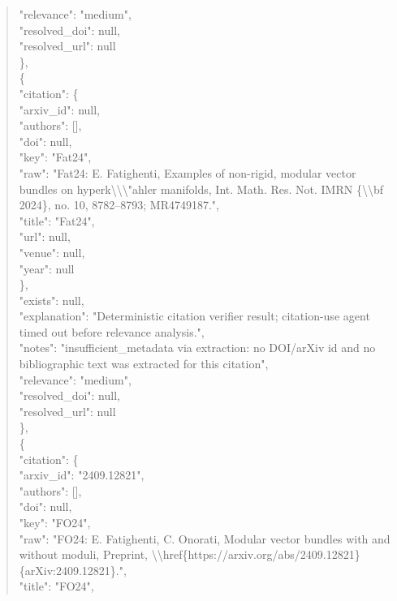 \documentclass[11pt]{article}
\begin{document}
\begin{quote}
      "relevance": "medium",\\
      "resolved\_doi": null,\\
      "resolved\_url": null\\
    \},\\
    \{\\
      "citation": \{\\
        "arxiv\_id": null,\\
        "authors": [],\\
        "doi": null,\\
        "key": "Fat24",\\
        "raw": "Fat24: E. Fatighenti, Examples of non-rigid, modular vector bundles on hyperk\textbackslash{}\textbackslash{}\textbackslash{}"ahler manifolds, Int. Math. Res. Not. IMRN \{\textbackslash{}\textbackslash{}bf 2024\}, no. 10, 8782--8793; MR4749187.",\\
        "title": "Fat24",\\
        "url": null,\\
        "venue": null,\\
        "year": null\\
      \},\\
      "exists": null,\\
      "explanation": "Deterministic citation verifier result; citation-use agent timed out before relevance analysis.",\\
      "notes": "insufficient\_metadata via extraction: no DOI/arXiv id and no bibliographic text was extracted for this citation",\\
      "relevance": "medium",\\
      "resolved\_doi": null,\\
      "resolved\_url": null\\
    \},\\
    \{\\
      "citation": \{\\
        "arxiv\_id": "2409.12821",\\
        "authors": [],\\
        "doi": null,\\
        "key": "FO24",\\
        "raw": "FO24: E. Fatighenti, C. Onorati, Modular vector bundles with and without moduli, Preprint, \textbackslash{}\textbackslash{}href\{https://arxiv.org/abs/2409.12821\}\{arXiv:2409.12821\}.",\\
        "title": "FO24",\\

\end{quote}
\end{document}
